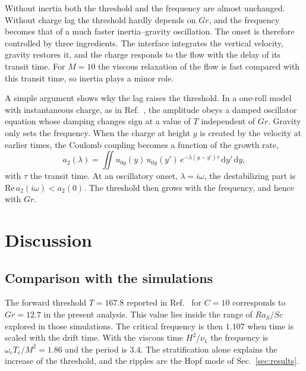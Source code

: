 \documentclass[aip,pof,reprint,amsmath,amssymb]{revtex4-2}
\newcommand{\dd}{\,\mathrm{d}}
\begin{document}
Without inertia both the threshold and the frequency are almost unchanged. Without charge
lag the threshold hardly depends on $Gr$, and the frequency becomes that of a much faster
inertia--gravity oscillation. The onset is therefore controlled by three ingredients.
The interface integrates the vertical velocity, gravity restores it, and the charge
responds to the flow with the delay of its transit time. For $M=10$ the viscous
relaxation of the flow is fast compared with this transit time, so inertia plays a
minor role.

A simple argument shows why the lag raises the threshold. In a one-roll model with
instantaneous charge, as in Ref.~, the amplitude obeys a damped
oscillator equation whose damping changes sign at a value of $T$ independent of $Gr$.
Gravity only sets the frequency. When the charge at height $y$ is created by the velocity
at earlier times, the Coulomb coupling becomes a function of the growth rate,
\begin{equation}
a_2(\lambda)=\iint u_{0y}(y)\,u_{0y}(y')\,e^{-\lambda(y-y')\tau}\dd y'\dd y,
\end{equation}
with $\tau$ the transit time. At an oscillatory onset, $\lambda=i\omega$, the destabilizing
part is $\mathrm{Re}\,a_2(i\omega)<a_2(0)$. The threshold then grows with the frequency,
and hence with $Gr$.

\section{Discussion}\label{sec:discussion}

\subsection{Comparison with the simulations}

The forward threshold $T=167.8$ reported in Ref.~ for $C=10$
corresponds to $Gr=12.7$ in the present analysis. This value lies inside the range of
$Ra_S/Sc$ explored in those simulations. The critical frequency is then $1.107$ when time
is scaled with the drift time. With the viscous time $H^2/\nu_1$ the frequency is
$\omega_cT_c/M^2=1.86$ and the period is $3.4$. The stratification alone explains the
increase of the threshold, and the ripples are the Hopf mode of Sec.~\ref{sec:results}.
\end{document}
